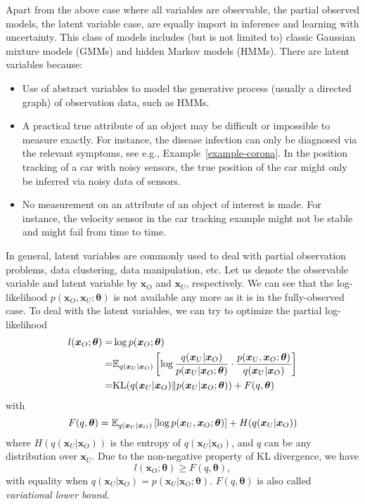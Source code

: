 Apart from the above case where all variables are observable, the partial observed models, the latent variable case, are equally import in inference and learning with uncertainty. This class of models includes (but is not limited to) classic Gaussian mixture models (GMMs) and hidden Markov models (HMMs). There are latent variables because:
\begin{itemize}
\item Use of abstract variables to model the generative process (usually a directed graph) of observation data, such as HMMs.
\item A practical true attribute of an object may be difficult or impossible to measure exactly. For instance, the disease infection can only be diagnosed via the relevant symptoms, see e.g., Example~\ref{example-corona}. In the position tracking of a car with noisy sensors, the true position of the car might only be inferred via noisy data of sensors.
\item No measurement on an attribute of an object of interest is made. For instance, the velocity sensor in the car tracking example might not be stable and might fail from time to time.
\end{itemize}
In general, latent variables are commonly used to deal with partial observation problems, data clustering, data manipulation, etc. Let us denote the observable variable and latent variable by $\bm{x}_O$ and $\bm{x}_U$, respectively. We can see that the log-likelihood $p(\bm{x}_O, \bm{x}_U; \bm{\theta})$ is not available any more as it is in the fully-observed case. To deal with the latent variables, we can try to optimize the partial log-likelihood
\begin{align}
  l(\bm{x}_O; \bm{\theta}) =& \log{p(\bm{x}_O; \bm{\theta})} \nonumber \\  
  = & \mathbb{E}_{q(\bm{x}_U|\bm{x}_O)}\left[ \log{\frac{q(\bm{x}_U|\bm{x}_O)}{p(\bm{x}_U|\bm{x}_O;\bm{\theta})} \cdot \frac{p(\bm{x}_U,\bm{x}_O;\bm{\theta})}{q(\bm{x}_U|\bm{x}_O)}} \right] \nonumber \\
  = & \mathrm{KL}(q(\bm{x}_U|\bm{x}_O)\|p(\bm{x}_U|\bm{x}_O;\bm{\theta})) + F(q, \bm{\theta})
\end{align}
with
\begin{equation}\label{chpt2:eq:llk-lower-bound}
  F(q, \bm{\theta}) = \mathbb{E}_{q(\bm{x}_U|\bm{x}_O)}\left[ \log{p(\bm{x}_U,\bm{x}_O;\bm{\theta})} \right] + H(q(\bm{x}_U|\bm{x}_O))
\end{equation}
where $H(q(\bm{x}_U|\bm{x}_O))$ is the entropy of $q(\bm{x}_U|\bm{x}_O)$, and $q$ can be any distribution over $\bm{x}_U$. Due to the non-negative property of KL divergence, we have
\begin{equation}
  l(\bm{x}_O; \bm{\theta}) \geq F(q, \bm{\theta}),
\end{equation}
with equality when $q(\bm{x}_U|\bm{x}_O) = p(\bm{x}_U|\bm{x}_O; \bm{\theta})$. $F(q, \bm{\theta})$ is also called \textit{variational lower bound}.

